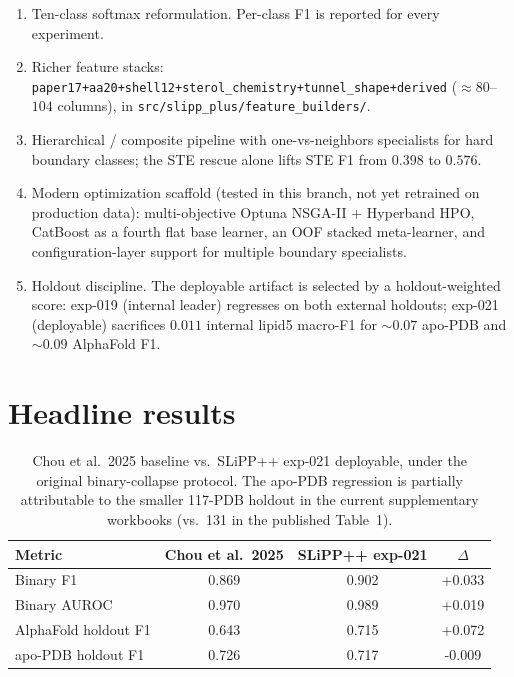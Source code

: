 \documentclass[11pt]{article}
\begin{document}
\begin{enumerate}
\item Ten-class softmax reformulation. Per-class F1 is reported for every experiment.
\item Richer feature stacks: \texttt{paper17\allowbreak+\allowbreak aa20\allowbreak+\allowbreak shell12\allowbreak+\allowbreak sterol\_chemistry\allowbreak+\allowbreak tunnel\_shape\allowbreak+\allowbreak derived} ($\approx\!80$--$104$ columns), in \texttt{src/slipp\_plus/feature\_builders/}.
\item Hierarchical / composite pipeline with one-vs-neighbors specialists for hard boundary classes; the STE rescue alone lifts STE F1 from $0.398$ to $0.576$.
\item Modern optimization scaffold (tested in this branch, not yet retrained on production data): multi-objective Optuna NSGA-II + Hyperband HPO, CatBoost as a fourth flat base learner, an OOF stacked meta-learner, and configuration-layer support for multiple boundary specialists.
\item Holdout discipline. The deployable artifact is selected by a holdout-weighted score: exp-019 (internal leader) regresses on both external holdouts; exp-021 (deployable) sacrifices $0.011$ internal lipid5 macro-F1 for $\sim\!0.07$ apo-PDB and $\sim\!0.09$ AlphaFold F1.
\end{enumerate}

\section{Headline results}

\begin{table}[htbp]
\centering
\renewcommand{\arraystretch}{1.05}
\begin{tabular}{@{}l S[table-format=1.3] S[table-format=1.3] S[table-format=+1.3]@{}}
\toprule
{Metric}              & {Chou et al.\ 2025} & {SLiPP++ exp-021} & {$\Delta$} \\
\midrule
Binary F1             & 0.869 & 0.902 & +0.033 \\
Binary AUROC          & 0.970 & 0.989 & +0.019 \\
AlphaFold holdout F1  & 0.643 & 0.715 & +0.072 \\
apo-PDB holdout F1    & 0.726 & 0.717 & -0.009 \\
\bottomrule
\end{tabular}
\renewcommand{\arraystretch}{1.0}
\caption{Chou et al.\ 2025 baseline \cite{chou2025} vs.\ SLiPP++ exp-021 deployable, under the original binary-collapse protocol. The apo-PDB regression is partially attributable to the smaller 117-PDB holdout in the current supplementary workbooks (vs.\ 131 in the published Table~1).}
\label{tab:headline}
\end{table}
\end{document}
